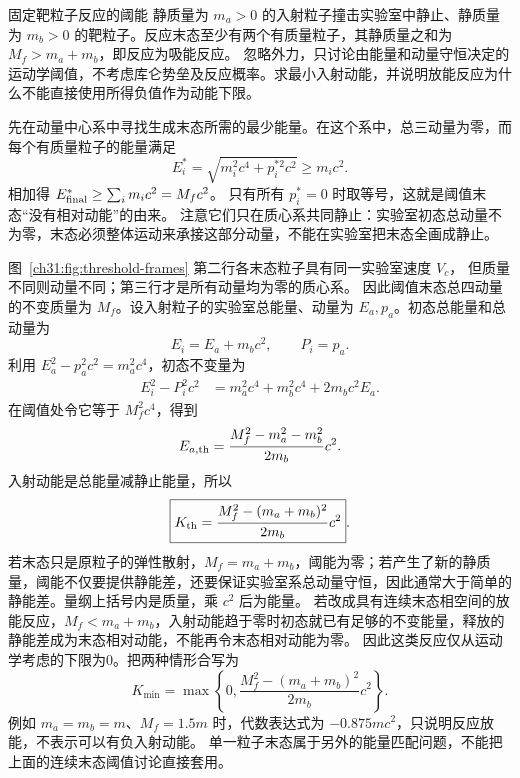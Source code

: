 \begin{origexamplebox}{固定靶粒子反应的阈能}
静质量为 $m_a>0$ 的入射粒子撞击实验室中静止、静质量为 $m_b>0$ 的靶粒子。反应末态至少有两个有质量粒子，其静质量之和为 $M_f>m_a+m_b$，即反应为吸能反应。
忽略外力，只讨论由能量和动量守恒决定的运动学阈值，不考虑库仑势垒及反应概率。求最小入射动能，并说明放能反应为什么不能直接使用所得负值作为动能下限。
\end{origexamplebox}
\begin{xesolution}
先在动量中心系中寻找生成末态所需的最少能量。在这个系中，总三动量为零，而每个有质量粒子的能量满足
\[
 E_i^*=\sqrt{m_i^2c^4+p_i^{*2}c^2}\ge m_ic^2.
\]
相加得 $E_{\rm final}^*\ge\sum_i m_ic^2=M_fc^2$。
只有所有 $p_i^*=0$ 时取等号，这就是阈值末态“没有相对动能”的由来。
注意它们只在质心系共同静止：实验室初态总动量不为零，末态必须整体运动来承接这部分动量，不能在实验室把末态全画成静止。
\begin{center}

\label{ch31:fig:threshold-frames}
\end{center}
图~\ref{ch31:fig:threshold-frames} 第二行各末态粒子具有同一实验室速度 $V_c$，
但质量不同则动量不同；第三行才是所有动量均为零的质心系。
因此阈值末态总四动量的不变质量为 $M_f$。设入射粒子的实验室总能量、动量为 $E_a,p_a$。初态总能量和总动量为
\[
 E_i=E_a+m_bc^2,
 \qquad P_i=p_a.
\]
利用 $E_a^2-p_a^2c^2=m_a^2c^4$，初态不变量为
\begin{align}
 E_i^2-P_i^2c^2
 &=m_a^2c^4+m_b^2c^4+2m_bc^2E_a.
\end{align}
在阈值处令它等于 $M_f^2c^4$，得到
\[
 E_{a,\rm th}=\frac{M_f^2-m_a^2-m_b^2}{2m_b}c^2.
\]
入射动能是总能量减静止能量，所以
\begin{equation}
 \boxed{K_{\rm th}=\frac{M_f^2-(m_a+m_b)^2}{2m_b}c^2}.
\end{equation}
若末态只是原粒子的弹性散射，$M_f=m_a+m_b$，阈能为零；若产生了新的静质量，阈能不仅要提供静能差，还要保证实验室系总动量守恒，因此通常大于简单的静能差。量纲上括号内是质量，乘 $c^2$ 后为能量。
若改成具有连续末态相空间的放能反应，$M_f<m_a+m_b$，入射动能趋于零时初态就已有足够的不变能量，释放的静能差成为末态相对动能，不能再令末态相对动能为零。
因此这类反应仅从运动学考虑的下限为0。把两种情形合写为
\[
 K_{\min}=\max\left\{0,\frac{M_f^2-(m_a+m_b)^2}{2m_b}c^2\right\}.
\]
例如 $m_a=m_b=m$、$M_f=1.5m$ 时，代数表达式为 $-0.875mc^2$，只说明反应放能，不表示可以有负入射动能。
单一粒子末态属于另外的能量匹配问题，不能把上面的连续末态阈值讨论直接套用。
\end{xesolution}


